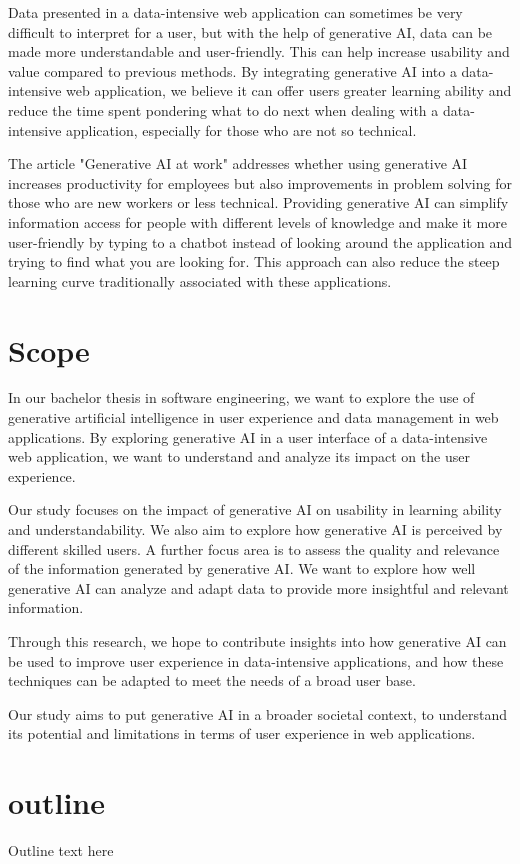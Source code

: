 Data presented in a data-intensive web application can sometimes be very difficult to interpret for a user, but with the help of generative AI, data can be made more understandable and user-friendly. This can help increase usability and value compared to previous methods. By integrating generative AI into a data-intensive web application, we believe it can offer users greater learning ability and reduce the time spent pondering what to do next when dealing with a data-intensive application, especially for those who are not so technical.

The article "Generative AI at work"\cite{generativAIAtWork} addresses whether using generative AI increases productivity for employees but also improvements in problem solving for those who are new workers or less technical. Providing generative AI can simplify information access for people with different levels of knowledge and make it more user-friendly by typing to a chatbot instead of looking around the application and trying to find what you are looking for. This approach can also reduce the steep learning curve traditionally associated with these applications.

\section{Scope}
In our bachelor thesis in software engineering, we want to explore the use of generative artificial intelligence in user experience and data management in web applications. By exploring generative AI in a user interface of a data-intensive web application, we want to understand and analyze its impact on the user experience.

Our study focuses on the impact of generative AI on usability in learning ability and understandability. We also aim to explore how generative AI is perceived by different skilled users. A further focus area is to assess the quality and relevance of the information generated by generative AI. We want to explore how well generative AI can analyze and adapt data to provide more insightful and relevant information.

Through this research, we hope to contribute insights into how generative AI can be used to improve user experience in data-intensive applications, and how these techniques can be adapted to meet the needs of a broad user base.

Our study aims to put generative AI in a broader societal context, to understand its potential and limitations in terms of user experience in web applications.

\section{outline}
Outline text here
